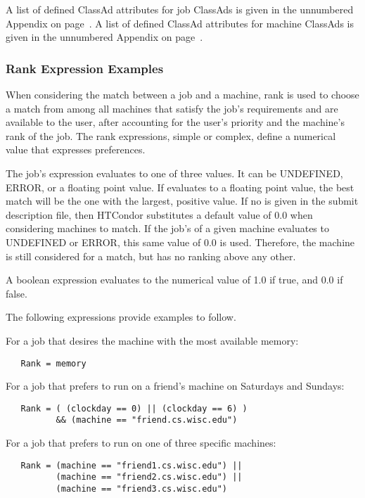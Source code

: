 A list of defined ClassAd attributes for job ClassAds
is given in the unnumbered Appendix on 
page~\pageref{sec:Job-ClassAd-Attributes}.
A list of defined ClassAd attributes for machine ClassAds
is given in the unnumbered Appendix on 
page~\pageref{sec:Machine-ClassAd-Attributes}.


\subsubsection{\label{rank-examples}Rank Expression Examples}

When considering the match between a job and a machine, rank is used
to choose a match from among all machines that satisfy the job's
requirements and are available to the user, after accounting for
the user's priority and the machine's rank of the job.
The rank expressions, simple or complex, define a numerical value
that expresses preferences.

The job's  expression evaluates to one of three values.
It can be UNDEFINED, ERROR, or a floating point value.
If  evaluates to a floating point value,
the best match will be the one with the largest, positive value.
If no  is given 
in the submit description file,
then HTCondor substitutes a default value of 0.0 when considering
machines to match.
If the job's  of a given machine evaluates
to UNDEFINED or ERROR,
this same value of 0.0 is used.
Therefore, the machine is still considered for a match,
but has no ranking above any other.

A boolean expression evaluates to the numerical value of 1.0
if true, and 0.0 if false.

The following  expressions provide examples to
follow.

For a job that desires the machine with the most available memory:
\begin{verbatim}
   Rank = memory
\end{verbatim}

For a job that prefers to run on a friend's machine
on Saturdays and Sundays:
\begin{verbatim}
   Rank = ( (clockday == 0) || (clockday == 6) )
          && (machine == "friend.cs.wisc.edu")
\end{verbatim}

For a job that prefers to run on one of three specific machines:
\begin{verbatim}
   Rank = (machine == "friend1.cs.wisc.edu") ||
          (machine == "friend2.cs.wisc.edu") ||
          (machine == "friend3.cs.wisc.edu")
\end{verbatim}

